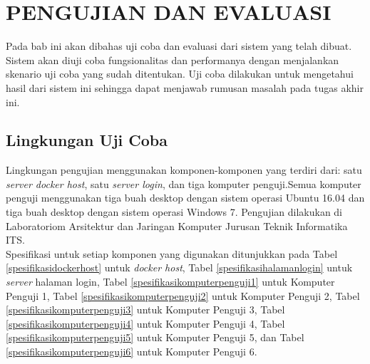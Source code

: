 \chapter{PENGUJIAN DAN EVALUASI}
	Pada bab ini akan dibahas uji coba dan evaluasi dari sistem yang telah dibuat. Sistem akan diuji coba fungsionalitas dan performanya dengan menjalankan skenario uji coba yang sudah ditentukan. Uji coba dilakukan untuk mengetahui hasil dari sistem ini sehingga dapat menjawab rumusan masalah pada tugas akhir ini.    
	
\section{Lingkungan Uji Coba}
	Lingkungan pengujian menggunakan komponen-komponen yang terdiri dari: satu \textit{server docker host}, satu \textit{server login}, dan tiga komputer penguji.Semua komputer penguji menggunakan tiga buah desktop dengan sistem operasi Ubuntu 16.04 dan tiga buah desktop dengan sistem operasi Windows 7. Pengujian dilakukan di Laboratoriom Arsitektur dan Jaringan Komputer Jurusan Teknik Informatika ITS. \\
    \indent Spesifikasi untuk setiap komponen yang digunakan ditunjukkan pada Tabel \ref{spesifikasidockerhost} untuk \textit{docker host}, Tabel \ref{spesifikasihalamanlogin} untuk \textit{server} halaman login, Tabel \ref{spesifikasikomputerpenguji1} untuk Komputer Penguji 1, Tabel \ref{spesifikasikomputerpenguji2} untuk Komputer Penguji 2, Tabel \ref{spesifikasikomputerpenguji3} untuk Komputer Penguji 3, Tabel \ref{spesifikasikomputerpenguji4} untuk Komputer Penguji 4, Tabel \ref{spesifikasikomputerpenguji5} untuk Komputer Penguji 5, dan Tabel \ref{spesifikasikomputerpenguji6} untuk Komputer Penguji 6.

